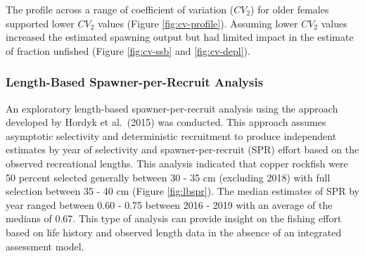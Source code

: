 \documentclass[11pt,
  english,
  a4paper,
]{article}
\begin{document}
\leavevmode\tagmcend\tagstructend\par


The profile across a range of coefficient of variation ({\(CV_2\)\leavevmode\tagmcend\tagstructend}) for older females supported lower {\(CV_2\)\leavevmode\tagmcend\tagstructend} values (Figure \ref{fig:cv-profile}). Assuming lower {\(CV_2\)\leavevmode\tagmcend\tagstructend} values increased the estimated spawning output but had limited impact in the estimate of fraction unfished (Figure \ref{fig:cv-ssb} and \ref{fig:cv-depl}).

\leavevmode\tagmcend\tagstructend\par


\hypertarget{length-based-spawner-per-recruit-analysis}{%
\subsubsection{Length-Based Spawner-per-Recruit Analysis}\label{length-based-spawner-per-recruit-analysis}}

\leavevmode\tagmcend\tagstructend


An exploratory length-based spawner-per-recruit analysis using the approach developed by Hordyk et al.~{(2015)\leavevmode\tagmcend\tagstructend} was conducted. This approach assumes asymptotic selectivity and deterministic recruitment to produce independent estimates by year of selectivity and spawner-per-recruit (SPR) effort based on the observed recreational lengths. This analysis indicated that copper rockfish were 50 percent selected generally between 30 - 35 cm (excluding 2018) with full selection between 35 - 40 cm (Figure \ref{fig:lbspr}). The median estimates of SPR by year ranged between 0.60 - 0.75 between 2016 - 2019 with an average of the medians of 0.67. This type of analysis can provide insight on the fishing effort based on life history and observed length data in the absence of an integrated assessment model.

\leavevmode\tagmcend\tagstructend\par
\end{document}
